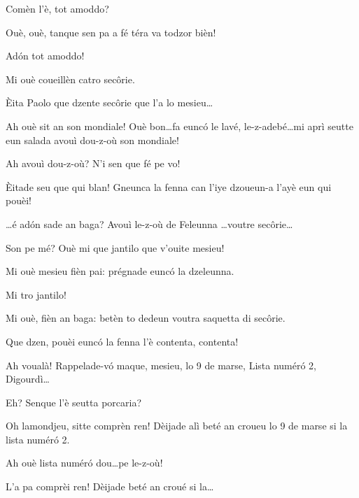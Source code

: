 \begin{drama}
\Cimaspeaks Comèn l'è, tot amoddo?

\Pompiolenspeaks Ouè, ouè, tanque sen pa a fé téra va todzor bièn!

\Cimaspeaks Ad\'on tot amoddo!

\Pompiolenspeaks Mi ouè coueillèn catro sec\^orie.

\Marcospeaks Èita Paolo que dzente sec\^orie que l'a lo mesieu\ldots

\Pompiolenspeaks Ah ouè sit an son mondiale! Ouè bon\ldots fa eunc\'o le lavé, le-z-adebé\ldots mi aprì seutte eun salada avouì dou-z-où \ou son mondiale!

\Marcospeaks Ah avouì dou-z-où? N'i sen que fé pe vo!


\Pompiolenspeaks {} Èitade seu que qui blan! Gneunca la fenna can l'iye dzoueun-a l'ayè eun qui pouèi!

\Cimaspeaks \ldots é ad\'on sade an baga? Avouì le-z-où de Feleunna \ldots  voutre sec\^orie\ldots 

\Pompiolenspeaks Son pe mé? Ouè mi que jantilo que v'ouite mesieu!

\Marcospeaks {} Mi ouè mesieu fièn pai: prégnade eunc\'o la dzeleunna.

\Pompiolenspeaks Mi tro jantilo! 

\Cimaspeaks Mi ouè, fièn an baga: betèn to dedeun  voutra saquetta di sec\^orie.


\Pompiolenspeaks Que dzen, pouèi eunc\'o la fenna l'è contenta, contenta!

\Cimaspeaks Ah voualà!  Rappelade-v\'o maque, mesieu, lo 9 de marse, Lista num\'er\'o 2, Digourdì\ldots

\Pompiolenspeaks Eh? Senque l'è seutta porcaria?

\Cimaspeaks {} Oh lamondjeu, sitte comprèn ren!  Dèijade alì beté an croueu lo 9 de marse si la lista num\'er\'o 2.

\Pompiolenspeaks Ah ouè lista num\'er\'o dou\ldots pe le-z-où!

\Cimaspeaks {} L'a pa comprèi ren!  Dèijade beté an croué si la\ldots


\end{drama}
